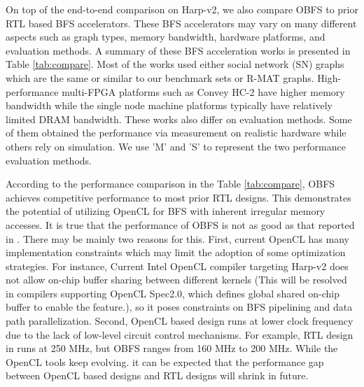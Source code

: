 On top of the end-to-end comparison on Harp-v2, we also compare 
OBFS to prior RTL based BFS accelerators. These BFS accelerators may 
vary on many different aspects such as graph types, memory bandwidth, 
hardware platforms, and evaluation methods. A summary of these BFS 
acceleration works is presented in Table \ref{tab:compare}.
Most of the works used either social network (SN) graphs which are the same or similar to our benchmark sets or R-MAT graphs. High-performance  
multi-FPGA platforms such as Convey HC-2 \cite{bakos2010high} have higher memory bandwidth while the single 
node machine platforms typically have relatively limited DRAM bandwidth. 
These works also differ on evaluation methods. 
Some of them obtained the performance via measurement on realistic hardware 
while others rely on simulation. 
We use 'M' and 'S' to represent the two performance evaluation methods.
 
According to the performance comparison in the Table \ref{tab:compare}, 
OBFS achieves competitive performance 
to most prior RTL designs. This demonstrates the potential of utilizing 
OpenCL for BFS with inherent irregular memory accesses. It is 
true that the performance of OBFS is not as good as that 
reported in \cite{yao2018efficient}. There may be 
mainly two reasons for this. First, current OpenCL has many 
implementation constraints which may limit the adoption of some 
optimization strategies. For instance, Current Intel OpenCL compiler 
targeting Harp-v2 does not allow on-chip buffer sharing between 
different kernels (This will be resolved in compilers supporting 
OpenCL Spec2.0, which defines global shared on-chip buffer to enable 
the feature.), so it poses constraints on BFS pipelining and 
data path parallelization. Second, OpenCL based design runs at 
lower clock frequency due to the lack of low-level circuit control 
mechanisms. For example, RTL design in \cite{yao2018efficient} runs 
at 250 MHz, but OBFS ranges from 160 MHz to 200 MHz. 
While the OpenCL tools keep evolving. it can be expected 
that the performance gap between OpenCL based designs 
and RTL designs will shrink in future. 

